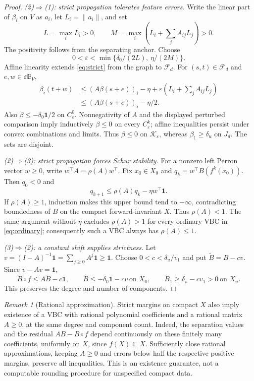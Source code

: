\documentclass[10pt,letterpaper]{article}
\theoremstyle{remark}
\newtheorem*{remark}{Remark}
\newcommand{\one}{\mathbf 1}
\newcommand{\ball}{\mathbb B_V}
\newcommand{\F}{\mathcal F_d}
\begin{document}
\begin{proof}
\emph{(2)$\Rightarrow$(1): strict propagation tolerates feature errors.}
Write the linear part of $\beta_i$ on $V$ as $a_i$, let $L_i=\|a_i\|$, and set
\[
 L=\max_i L_i>0,\qquad
 M=\max_i\left(L_i+\sum_j A_{ij}L_j\right)>0.
\]
The positivity follows from the separating anchor. Choose
\[
 0<\varepsilon<\min\{\delta_0/(2L),\ \eta/(2M)\}.
\]
Affine linearity extends \eqref{eq:strict} from the graph to $\F$. For $(s,t)\in\F$ and $e,w\in\varepsilon\ball$,
\begin{align*}
 \beta_i(t+w)
 &\leq (A\beta(s+e))_i-\eta
       +\varepsilon\left(L_i+\sum_j A_{ij}L_j\right)\\
 &\leq (A\beta(s+e))_i-\eta/2.
\end{align*}
Also $\beta\leq-\delta_0\one/2$ on $C_\varepsilon^0$. Nonnegativity of $A$ and the displayed perturbed comparison imply inductively $\beta\leq0$ on every $C_\varepsilon^k$; affine inequalities persist under convex combinations and limits. Thus $\beta\leq0$ on $\mathcal K_\varepsilon$, whereas $\beta_1\geq\delta_u$ on $J_d$. The sets are disjoint.

\emph{(2)$\Rightarrow$(3): strict propagation forces Schur stability.}
For a nonzero left Perron vector $w\geq0$, write $w^\top A=\rho(A)w^\top$. Fix $x_0\in X_0$ and $q_k=w^\top B(f^k(x_0))$. Then $q_0<0$ and
\[
 q_{k+1}\leq\rho(A)q_k-\eta w^\top\one.
\]
If $\rho(A)\geq1$, induction makes this upper bound tend to $-\infty$, contradicting boundedness of $B$ on the compact forward-invariant $X$. Thus $\rho(A)<1$. The same argument without $\eta$ excludes $\rho(A)>1$ for every ordinary VBC in \eqref{eq:ordinary}; consequently such a VBC always has $\rho(A)\leq1$.

\emph{(3)$\Rightarrow$(2): a constant shift supplies strictness.}
Let $v=(I-A)^{-1}\one=\sum_{j\geq0}A^j\one\geq\one$. Choose $0<c<\delta_u/v_1$ and put $\widetilde B=B-cv$. Since $v-Av=\one$,
\[
 \widetilde B\circ f\leq A\widetilde B-c\one,\qquad
 \widetilde B\leq-\delta_0\one-cv\ \text{on }X_0,\qquad
 \widetilde B_1\geq\delta_u-cv_1>0\ \text{on }X_u.
\]
This preserves the degree and number of components.
\end{proof}

\begin{remark}[Rational approximation]
Strict margins on compact $X$ also imply existence of a VBC with rational polynomial coefficients and a rational matrix $A\geq0$, at the same degree and component count. Indeed, the separation values and the residual $AB-B\circ f$ depend continuously on these finitely many coefficients, uniformly on $X$, since $f(X)\subseteq X$. Sufficiently close rational approximations, keeping $A\geq0$ and errors below half the respective positive margins, preserve all inequalities. This is an existence guarantee, not a computable rounding procedure for unspecified compact data.
\end{remark}
\end{document}
